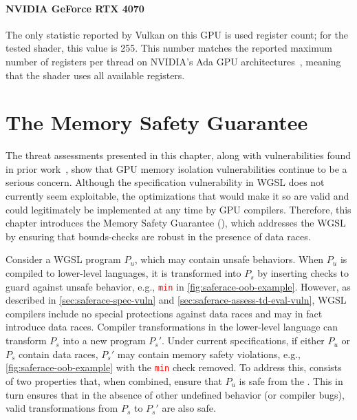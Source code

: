 \paragraph{NVIDIA GeForce RTX 4070} The only statistic reported by Vulkan on this GPU is used register count; for the tested shader, this value is 255. This number matches the reported maximum number of registers per thread on NVIDIA's Ada GPU architectures~\cite{nvidia2024cudaada}, meaning that the shader uses all available registers.

\section{The \saferace Memory Safety Guarantee \label{sec:saferace-smsg}}

The threat assessments presented in this chapter, along with vulnerabilities found in prior work~\cite{dipietro2016cudaleaks,lee2014stealing,sorensen2024leftoverlocals,guo2024usenix}, show that GPU memory isolation vulnerabilities continue to be a serious concern. Although the specification vulnerability in WGSL does not currently seem exploitable, the optimizations that would make it so are valid and could legitimately be implemented at any time by GPU compilers. Therefore, this chapter introduces the \saferace Memory Safety Guarantee (\smsg), which addresses the WGSL \drsv by ensuring that bounds-checks are robust in the presence of data races.

Consider a WGSL program $P_u$, which may contain unsafe behaviors. When $P_u$ is compiled to lower-level languages, it is transformed into $P_s$ by inserting checks to guard against unsafe behavior, e.g., \textcolor{red}{\texttt{min}} in \myfig\ref{fig:saferace-oob-example}. However, as described in \mysec\ref{sec:saferace-spec-vuln} and \mysec\ref{sec:saferace-assess-td-eval-vuln}, WGSL compilers include no special protections against data races and may in fact introduce data races. Compiler transformations in the lower-level language can transform $P_s$ into a new program $P_s'$. Under current specifications, if either $P_u$ or $P_s$ contain data races, $P_s'$ may contain memory safety violations, e.g., \myfig\ref{fig:saferace-oob-example} with the \textcolor{red}{\texttt{min}} check removed. To address this, \smsg consists of two properties that, when combined, ensure that $P_u$ is safe from the \drsv. This in turn ensures that in the absence of other undefined behavior (or compiler bugs), valid transformations from $P_s$ to $P_s'$ are also safe.

